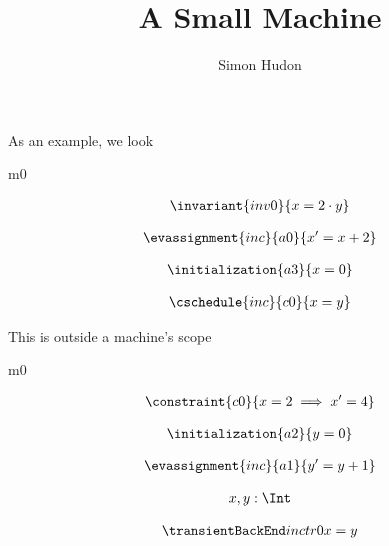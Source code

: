 \documentclass[12pt]{amsart}
\title{A Small Machine}
\author{Simon Hudon}
\date{} %
\begin{document}
\maketitle

As an example, we look

\begin{machine}{m0}


\begin{align*}
\invariant{inv0}
{	x = 2 \cdot y	}
\end{align*}

\begin{align*}
\evassignment{inc}{a0}
{	x' = x + 2	}
\end{align*}

\begin{align*}
\initialization{a3}
{	x = 0	}
\end{align*}


\begin{align*}
\cschedule{inc}{c0}
{	x = y	}
\end{align*}

\end{machine}

This is outside a machine's scope

\begin{machine}{m0}

\begin{align*}
\constraint{c0}
{	x = 2 \implies x' = 4	}
\end{align*}

\begin{align*}
\initialization{a2}
{	y = 0	}
\end{align*}

\begin{align*}
\evassignment{inc}{a1}
{	y' = y + 1	}
\end{align*}

\begin{align*}
\variable{	x,y: \Int}
\end{align*}

\begin{align*}
\transient{inc}{0}{tr0}
{	x = y	}
\end{align*}


\end{machine}
\end{document}

